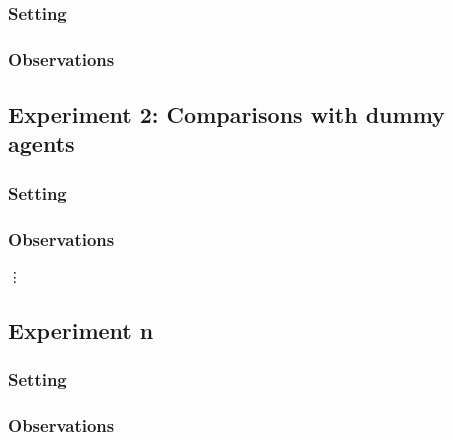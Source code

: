 \documentclass[11pt]{article}
\begin{document}
\subsubsection{Setting}

\subsubsection{Observations}

\subsection{Experiment 2: Comparisons with dummy agents}

\subsubsection{Setting}

\subsubsection{Observations}

\vdots

\subsection{Experiment n}

\subsubsection{Setting}

\subsubsection{Observations}
\end{document}
